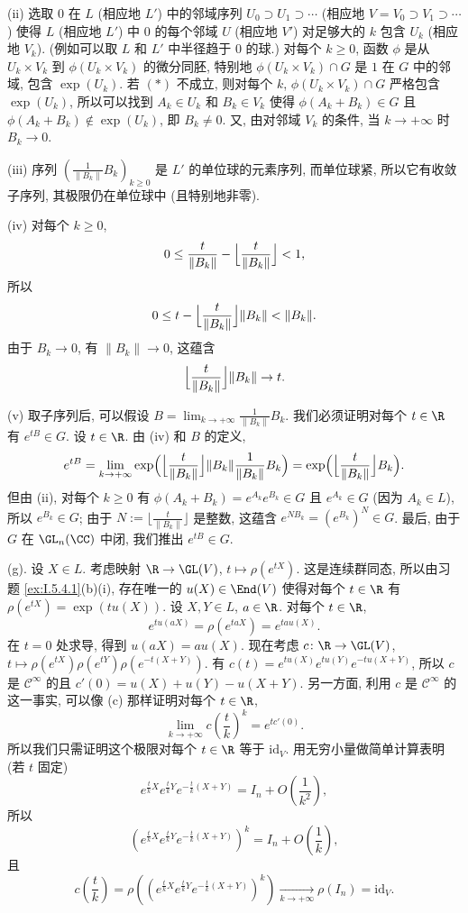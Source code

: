 \begin{solution}
(ii) 选取 $0$ 在 $L$ (相应地 $L'$) 中的邻域序列 $U_0 \supset U_1 \supset \cdots$ (相应地 $V = V_0 \supset V_1 \supset \cdots$) 使得 $L$ (相应地 $L'$) 中 $0$ 的每个邻域 $U$ (相应地 $V'$) 对足够大的 $k$ 包含 $U_k$ (相应地 $V_k$). (例如可以取 $L$ 和 $L'$ 中半径趋于 $0$ 的球.) 对每个 $k \geq 0$, 函数 $\phi$ 是从 $U_k \times V_k$ 到 $\phi(U_k \times V_k)$ 的微分同胚, 特别地 $\phi(U_k \times V_k) \cap G$ 是 $1$ 在 $G$ 中的邻域, 包含 $\exp(U_k)$. 若 $(*)$ 不成立, 则对每个 $k$, $\phi(U_k \times V_k) \cap G$ 严格包含 $\exp(U_k)$, 所以可以找到 $A_k \in U_k$ 和 $B_k \in V_k$ 使得 $\phi(A_k + B_k) \in G$ 且 $\phi(A_k + B_k) \notin \exp(U_k)$, 即 $B_k \neq 0$. 又, 由对邻域 $V_k$ 的条件, 当 $k \to +\infty$ 时 $B_k \to 0$.

(iii) 序列 $(\frac{1}{\|B_k\|}B_k)_{k \geq 0}$ 是 $L'$ 的单位球的元素序列, 而单位球紧, 所以它有收敛子序列, 其极限仍在单位球中 (且特别地非零).

(iv) 对每个 $k \geq 0$,
\[
0 \leq \frac{t}{\|B_k\|} - \Bigl\lfloor\frac{t}{\|B_k\|}\Bigr\rfloor < 1,
\]
所以
\[
0 \leq t - \Bigl\lfloor\frac{t}{\|B_k\|}\Bigr\rfloor\|B_k\| < \|B_k\|.
\]
由于 $B_k \to 0$, 有 $\|B_k\| \to 0$, 这蕴含
\[
\Bigl\lfloor\frac{t}{\|B_k\|}\Bigr\rfloor\|B_k\| \to t.
\]

(v) 取子序列后, 可以假设 $B = \lim_{k \to +\infty}\frac{1}{\|B_k\|}B_k$. 我们必须证明对每个 $t \in \R$ 有 $e^{tB} \in G$. 设 $t \in \R$. 由 (iv) 和 $B$ 的定义,
\[
e^{tB} = \lim_{k \to +\infty}\exp\Bigl(\Bigl\lfloor\frac{t}{\|B_k\|}\Bigr\rfloor\|B_k\|\frac{1}{\|B_k\|}B_k\Bigr) = \exp\Bigl(\Bigl\lfloor\frac{t}{\|B_k\|}\Bigr\rfloor B_k\Bigr).
\]
但由 (ii), 对每个 $k \geq 0$ 有 $\phi(A_k + B_k) = e^{A_k}e^{B_k} \in G$ 且 $e^{A_k} \in G$ (因为 $A_k \in L$), 所以 $e^{B_k} \in G$; 由于 $N := \lfloor\frac{t}{\|B_k\|}\rfloor$ 是整数, 这蕴含 $e^{NB_k} = (e^{B_k})^N \in G$. 最后, 由于 $G$ 在 $\GL_n(\CC)$ 中闭, 我们推出 $e^{tB} \in G$.

(g). 设 $X \in L$. 考虑映射 $\R \to \GL(V)$, $t \longmapsto \rho(e^{tX})$. 这是连续群同态, 所以由习题 \ref{ex:I.5.4.1}(b)(i), 存在唯一的 $u(X) \in \End(V)$ 使得对每个 $t \in \R$ 有 $\rho(e^{tX}) = \exp(tu(X))$.
设 $X, Y \in L$, $a \in \R$. 对每个 $t \in \R$,
\[
e^{tu(aX)} = \rho(e^{taX}) = e^{tau(X)}.
\]
在 $t = 0$ 处求导, 得到 $u(aX) = au(X)$. 现在考虑 $c \colon \R \to \GL(V)$, $t \longmapsto \rho(e^{tX})\rho(e^{tY})\rho(e^{-t(X+Y)})$. 有 $c(t) = e^{tu(X)}e^{tu(Y)}e^{-tu(X+Y)}$, 所以 $c$ 是 $\mathcal{C}^{\infty}$ 的且 $c'(0) = u(X) + u(Y) - u(X+Y)$. 另一方面, 利用 $c$ 是 $\mathcal{C}^{\infty}$ 的这一事实, 可以像 (c) 那样证明对每个 $t \in \R$,
\[
\lim_{k \to +\infty}c(\frac{t}{k})^k = e^{tc'(0)}.
\]
所以我们只需证明这个极限对每个 $t \in \R$ 等于 $\mathrm{id}_V$. 用无穷小量做简单计算表明 (若 $t$ 固定)
\[
e^{\frac{t}{k}X}e^{\frac{t}{k}Y}e^{-\frac{t}{k}(X+Y)} = I_n + O(\frac{1}{k^2}),
\]
所以
\[
(e^{\frac{t}{k}X}e^{\frac{t}{k}Y}e^{-\frac{t}{k}(X+Y)})^k = I_n + O(\frac{1}{k}),
\]
且
\[
c(\frac{t}{k}) = \rho((e^{\frac{t}{k}X}e^{\frac{t}{k}Y}e^{-\frac{t}{k}(X+Y)})^k) \xrightarrow[k \to +\infty]{} \rho(I_n) = \mathrm{id}_V.
\]
\end{solution}

